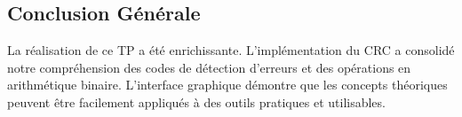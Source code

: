\documentclass[12pt, a4paper]{article}
\begin{document}
\subsection{Conclusion Générale}

La réalisation de ce TP a été enrichissante. L'implémentation du CRC a consolidé notre compréhension des codes de détection d'erreurs et des opérations en arithmétique binaire. L'interface graphique démontre que les concepts théoriques peuvent être facilement appliqués à des outils pratiques et utilisables.
\end{document}
